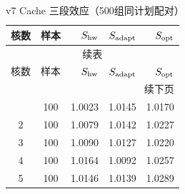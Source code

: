 \begin{longtable}{ccrrr}
\caption{v7 Cache 三段效应（500组同计划配对）}\label{tab:v7-cache}\\
\toprule
核数 & 样本 & $S_{\rm hw}$ & $S_{\rm adapt}$ & $S_{\rm opt}$ \\
\midrule
\endfirsthead
\multicolumn{5}{c}{续表}\\
\toprule
核数 & 样本 & $S_{\rm hw}$ & $S_{\rm adapt}$ & $S_{\rm opt}$ \\
\midrule
\endhead
\midrule\multicolumn{5}{r}{续下页}\\
\endfoot
\bottomrule
\endlastfoot
1 & 100 & 1.0023 & 1.0145 & 1.0170 \\
2 & 100 & 1.0079 & 1.0142 & 1.0227 \\
3 & 100 & 1.0090 & 1.0127 & 1.0220 \\
4 & 100 & 1.0164 & 1.0092 & 1.0257 \\
5 & 100 & 1.0146 & 1.0139 & 1.0289 \\
\end{longtable}
